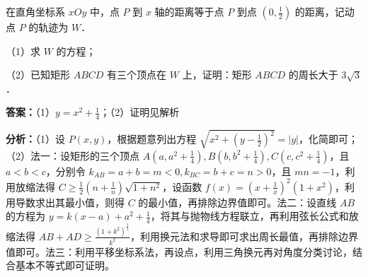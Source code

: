 \begin{question}[points=12]
在直角坐标系 $xOy$ 中，点 $P$ 到 $x$ 轴的距离等于点 $P$ 到点 $(0,\frac{1}{2})$ 的距离，记动点 $P$ 的轨迹为 $W$．

（1）求 $W$ 的方程；

（2）已知矩形 $ABCD$ 有三个顶点在 $W$ 上，证明：矩形 $ABCD$ 的周长大于 $3\sqrt{3}$．
\begin{solution}
\textbf{答案：}（1）$y=x^2+\frac{1}{4}$；（2）证明见解析

\textbf{分析：}（1）设 $P(x,y)$，根据题意列出方程 $\sqrt{x^2+(y-\frac{1}{2})^2}=|y|$，化简即可；（2）法一：设矩形的三个顶点 $A(a,a^2+\frac{1}{4}), B(b,b^2+\frac{1}{4}), C(c,c^2+\frac{1}{4})$，且 $a<b<c$，分别令 $k_{AB}=a+b=m<0, k_{BC}=b+c=n>0$，且 $mn=-1$，利用放缩法得 $C\geq \frac{1}{2}(n+\frac{1}{n})\sqrt{1+n^2}$，设函数 $f(x)=(x+\frac{1}{x})^2(1+x^2)$，利用导数求出其最小值，则得 $C$ 的最小值，再排除边界值即可。法二：设直线 $AB$ 的方程为 $y=k(x-a)+a^2+\frac{1}{4}$，将其与抛物线方程联立，再利用弦长公式和放缩法得 $AB+AD\geq \frac{(1+k^2)^{\frac{3}{2}}}{k^2}$，利用换元法和求导即可求出周长最值，再排除边界值即可。法三：利用平移坐标系法，再设点，利用三角换元再对角度分类讨论，结合基本不等式即可证明。


\end{solution}
\end{question}
